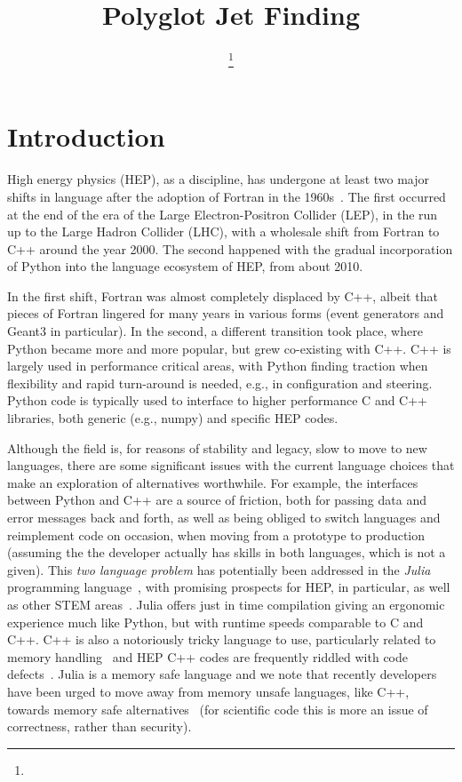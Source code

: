 \documentclass{webofc}
\title{Polyglot Jet Finding}
\author{\firstname{Graeme Andrew} \lastname{Stewart}\inst{1}\fnsep\thanks{\email{graeme.andrew.stewart@cern.ch}} \and
        \firstname{Philippe} \lastname{Gras}\inst{2}\fnsep \and
        \firstname{Benedikt} \lastname{Hegner}\inst{1}\fnsep \and
        \firstname{Atell} \lastname{Krasnopolski}\inst{3}
}
\institute{CERN, Esplanade des Particules 1, Geneva, Switzerland
\and
           IRFU, CEA, Université Paris-Saclay, Gif-sur-Yvette, France
\and
           Taras Shevchenko National University of Kyiv, Ukraine
          }
\begin{document}
\maketitle

\section{Introduction}
\label{sec:introduction}

High energy physics (HEP), as a discipline, has undergone at least two major
shifts in language after the adoption of Fortran in the
1960s~\cite{pivarski2022}. The first occurred at the end of the era of the Large
Electron-Positron Collider (LEP), in the run up to the Large Hadron Collider
(LHC), with a wholesale shift from Fortran to C++ around the year 2000. The
second happened with the gradual incorporation of Python into the language
ecosystem of HEP, from about 2010.

In the first shift, Fortran was almost completely displaced by C++, albeit that
pieces of Fortran lingered for many years in various forms (event generators and
Geant3 in particular). In the second, a different transition took place, where
Python became more and more popular, but grew co-existing with C++. C++ is
largely used in performance critical areas, with Python finding traction when
flexibility and rapid turn-around is needed, e.g., in configuration and
steering. Python code is typically used to interface to higher performance C and
C++ libraries, both generic (e.g., numpy) and specific HEP codes.

Although the field is, for reasons of stability and legacy, slow to move to new
languages, there are some significant issues with the current language choices
that make an exploration of alternatives worthwhile. For example, the interfaces
between Python and C++ are a source of friction, both for passing data and error
messages back and forth, as well as being obliged to switch languages and
reimplement code on occasion, when moving from a prototype to production
(assuming the the developer actually has skills in both languages, which is not
a given). This \emph{two language problem} has potentially been addressed in the
\emph{Julia} programming
language~\cite{bib:julia_freshapproach,10.1145/3276490}, with promising
prospects for HEP, in particular, \cite{Stanitzki:2020bnx,eschle2023potential} as well as
other STEM areas~\cite{perkel-julia-science}. Julia offers just in time
compilation giving an ergonomic experience much like Python, but with runtime
speeds comparable to C and C++. C++ is also a notoriously tricky language to
use, particularly related to memory handling~\cite{ms-security-2019} and HEP C++
codes are frequently riddled with code defects~\cite{Naumann_2014}. Julia is
a memory safe language and we note that recently developers have been
urged to move away from memory unsafe languages, like C++, towards memory safe
alternatives~\cite{nsa-cybersecurity} (for scientific code this is more an
issue of correctness, rather than security).
\end{document}
